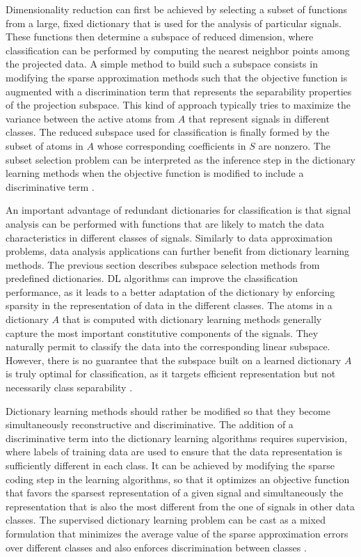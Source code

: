 Dimensionality reduction can first be achieved by selecting a subset of functions from a large, fixed dictionary that is used for the analysis of particular signals. These functions then determine a subspace of reduced dimension, where classification can be performed by computing the nearest neighbor points among the projected data. A simple method to build such a subspace consists in modifying the sparse approximation methods such that the objective function is augmented with a discrimination term that represents the separability properties of the projection subspace. This kind of approach typically tries to maximize the variance between the active atoms from $A$ that represent signals in different classes. The reduced subspace used for classification is finally formed by the subset of atoms in $A$ whose corresponding coefficients in $S$ are nonzero. The subset selection problem can be interpreted as the inference step in the dictionary learning methods when the objective function is modified to include a discriminative term \cite{tosic2011dictionary}.

An important advantage of redundant dictionaries for classification is that signal analysis can be performed with functions that are likely to match the data characteristics in different classes of signals. Similarly to data approximation problems, data analysis applications can further benefit from dictionary learning methods. The previous section describes subspace selection methods from predefined dictionaries. DL algorithms can improve the classification performance, as it leads to a better adaptation of the dictionary by enforcing sparsity in the representation of data in the different classes. The atoms in a dictionary $A$ that is computed with dictionary learning methods generally capture the most important constitutive components of the signals. They naturally permit to classify the data into the corresponding linear subspace. However, there is no guarantee that the subspace built on a learned dictionary $A$ is truly optimal for classification, as it targets efficient representation but not necessarily class separability \cite{tosic2011dictionary}.

Dictionary learning methods should rather be modified so that they become simultaneously reconstructive and discriminative. The addition of a discriminative term into the dictionary learning algorithms requires supervision, where labels of training data are used to ensure that the data representation is sufficiently different in each class. It can be achieved by modifying the sparse coding step in the learning algorithms, so that it optimizes an objective function that favors the sparsest representation of a given signal and simultaneously the representation that is also the most different from the one of signals in other data classes. The supervised dictionary learning problem can be cast as a mixed formulation that minimizes the average value of the sparse approximation errors over different classes and also enforces discrimination between classes \cite{tosic2011dictionary}.

